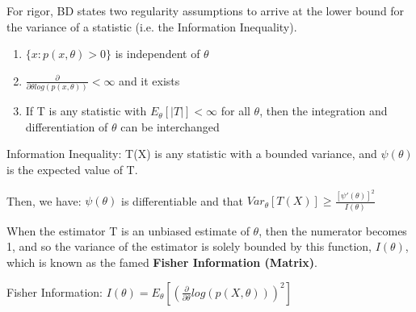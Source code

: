 			For rigor, BD states two regularity assumptions to  arrive at the lower bound for the variance of a statistic (i.e. the Information Inequality).

			\begin{enumerate}
				\item $\{x: p(x, \theta) > 0 \}$ is independent of $\theta$
				\item $\frac{\partial}{\partial \theta log(p(x, \theta))} < \infty$ and it exists
				\item If T is any statistic with $E_\theta[|T|] < \infty$ for all $\theta$, then the integration and differentiation of $\theta$ can be interchanged
			\end{enumerate}

			\begin{theorem}{Information Inequality:}
				T(X) is any statistic with a bounded variance, and $\psi(\theta)$ is the expected value of T.

				Then, we have: 
				$\psi(\theta)$ is differentiable and that $Var_\theta [ T(X) ] \ge \frac{[\psi'(\theta)]^2}{I(\theta)}$
			\end{theorem}

			When the estimator T is an unbiased estimate of $\theta$, then the numerator becomes 1, and so the variance of the estimator is solely bounded by this function, $I(\theta)$, which is known as the famed \textbf{Fisher Information (Matrix)}.

			\begin{definition}{Fisher Information:}
				$I(\theta) = E_\theta [ (\frac{\partial}{\partial \theta} log (p(X, \theta)))^2 ]$
			\end{definition}




